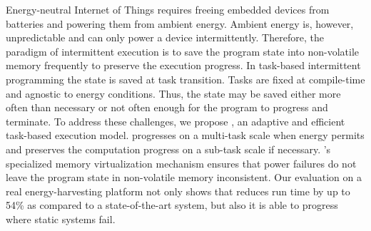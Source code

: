 
Energy-neutral Internet of Things requires freeing embedded devices from batteries and powering them from ambient energy. Ambient energy is, however, unpredictable and can only power a device intermittently. Therefore, the paradigm of intermittent execution is to save the program state into non-volatile memory frequently to preserve the execution progress. In task-based intermittent programming the state is saved at task transition. Tasks are fixed at compile-time and agnostic to energy conditions. Thus, the state may be saved either more often than necessary or not often enough for the program to progress and terminate. To address these challenges, we propose \sys, an adaptive and efficient task-based execution model. \sys progresses on a multi-task scale when energy permits and preserves the computation progress on a sub-task scale if necessary. \sys's specialized memory virtualization mechanism ensures that power failures do not leave the program state in non-volatile memory inconsistent. Our evaluation on a real energy-harvesting platform not only shows that \sys reduces run time by up to 54\% as compared to a state-of-the-art system, but also it is able to progress where static systems fail.